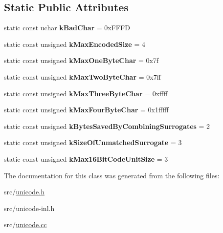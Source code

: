\subsection*{Static Public Attributes}
\begin{DoxyCompactItemize}
\item 
\hypertarget{classunibrow_1_1_utf8_a4e5ed3c61ce8976082104caf8f6e2ff8}{}static const uchar {\bfseries k\+Bad\+Char} = 0x\+F\+F\+F\+D\label{classunibrow_1_1_utf8_a4e5ed3c61ce8976082104caf8f6e2ff8}

\item 
\hypertarget{classunibrow_1_1_utf8_a863e13744b7f1bafb2e7cefa88db22e8}{}static const unsigned {\bfseries k\+Max\+Encoded\+Size} = 4\label{classunibrow_1_1_utf8_a863e13744b7f1bafb2e7cefa88db22e8}

\item 
\hypertarget{classunibrow_1_1_utf8_a133ef06049e8474299fe9a84de6f2de0}{}static const unsigned {\bfseries k\+Max\+One\+Byte\+Char} = 0x7f\label{classunibrow_1_1_utf8_a133ef06049e8474299fe9a84de6f2de0}

\item 
\hypertarget{classunibrow_1_1_utf8_ab9ef696115d867a8a3d8e66db07d8211}{}static const unsigned {\bfseries k\+Max\+Two\+Byte\+Char} = 0x7ff\label{classunibrow_1_1_utf8_ab9ef696115d867a8a3d8e66db07d8211}

\item 
\hypertarget{classunibrow_1_1_utf8_a0c0efe6dd154eaddb19bfbc7001307aa}{}static const unsigned {\bfseries k\+Max\+Three\+Byte\+Char} = 0xffff\label{classunibrow_1_1_utf8_a0c0efe6dd154eaddb19bfbc7001307aa}

\item 
\hypertarget{classunibrow_1_1_utf8_a7d30c60658c9742cfe77512de617a4b6}{}static const unsigned {\bfseries k\+Max\+Four\+Byte\+Char} = 0x1fffff\label{classunibrow_1_1_utf8_a7d30c60658c9742cfe77512de617a4b6}

\item 
\hypertarget{classunibrow_1_1_utf8_ad8db1cc81f7247e91d356a28392c79f9}{}static const unsigned {\bfseries k\+Bytes\+Saved\+By\+Combining\+Surrogates} = 2\label{classunibrow_1_1_utf8_ad8db1cc81f7247e91d356a28392c79f9}

\item 
\hypertarget{classunibrow_1_1_utf8_ae299e468227458f62545d61201a256eb}{}static const unsigned {\bfseries k\+Size\+Of\+Unmatched\+Surrogate} = 3\label{classunibrow_1_1_utf8_ae299e468227458f62545d61201a256eb}

\item 
\hypertarget{classunibrow_1_1_utf8_ac950664b85f1ad13505134334f32d0c5}{}static const unsigned {\bfseries k\+Max16\+Bit\+Code\+Unit\+Size} = 3\label{classunibrow_1_1_utf8_ac950664b85f1ad13505134334f32d0c5}

\end{DoxyCompactItemize}


The documentation for this class was generated from the following files\+:\begin{DoxyCompactItemize}
\item 
src/\hyperlink{unicode_8h}{unicode.\+h}\item 
src/unicode-\/inl.\+h\item 
src/\hyperlink{unicode_8cc}{unicode.\+cc}\end{DoxyCompactItemize}
